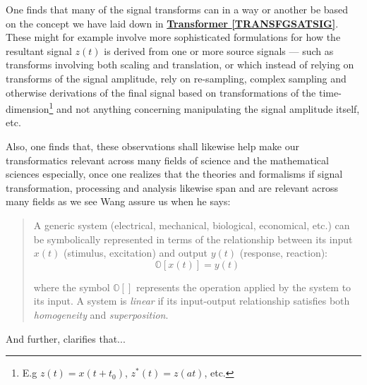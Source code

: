 \documentclass[a4paper, 18pt]{book} %
\begin{document}
\begin{appendices}
One finds that many of the signal transforms can in a way or another be based on the concept we have laid down in \textbf{\hyperref[TRANSFGSATSIG]{Transformer \ref{TRANSFGSATSIG}}}. These might for example involve more sophisticated formulations for how the resultant signal $z(t)$ is derived from one or more source signals --- such as transforms involving both scaling and translation, or which instead of relying on transforms of the signal amplitude, rely on re-sampling, complex sampling and otherwise derivations of the final signal based on transformations of the time-dimension\footnote{E.g $z(t) = x(t + t_0)$, $z^*(t) = z(at)$, etc.} and not anything concerning manipulating the signal amplitude itself, etc.

\vspace{2em}

Also, one finds that, these observations shall likewise help make our transformatics relevant across many fields of science and the mathematical sciences especially, once one realizes that the theories and formalisms if signal transformation, processing and analysis likewise span and are relevant across many fields as we see Wang assure us when he says:


\noindent
\begin{minipage}{1\textwidth}
\vspace{1em}
\begin{quotation}
{\ttfamily

A generic system (electrical, mechanical, biological, economical, etc.) can be symbolically represented in terms of the relationship between its input $x(t)$ (stimulus, excitation) and output $y(t)$ (response, reaction):\\

\begin{equation}
\mathbb{O}[x(t)] = y(t)
\end{equation}

where the symbol $\mathbb{O}[ ]$ represents the operation applied by the system to its input. A system is \textit{linear} if its input-output relationship satisfies both \textit{homogeneity} and \textit{superposition}.\\

}
\end{quotation}
\vspace{1em}
\end{minipage}

\vspace{2em}

And further, clarifies that...


\end{appendices}
\end{document}
